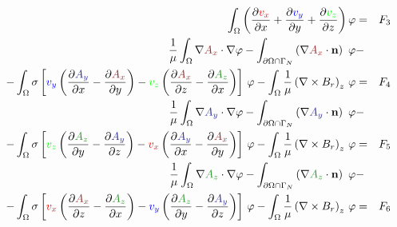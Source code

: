 \documentclass[smallextended]{svjour3}       %
\begin{document}
\begin{eqnarray}
			\int_{\Omega} \left(\frac{\partial \textcolor{red}{v_x}}{\partial x} + \frac{\partial \textcolor{blu}{v_y}}{\partial y} + \frac{\partial \textcolor{gre}{v_z}}{\partial z}\right) \varphi & = & F_3\\
			\frac{1}{\mu}\int_{\Omega}\nabla \textcolor{darkred}{A_x} \cdot \nabla \varphi - \int_{\partial \Omega \cap \Gamma_{N}} \left(\nabla \textcolor{darkred}{A_x}\cdot \mathbf{n}\right)\ \varphi 
			 \nonumber& - \\
			-  \int_{\Omega} \sigma \left[\textcolor{blu}{v_y} \left(\frac{\partial \textcolor{darkblu}{A_y}}{\partial x} - \frac{\partial \textcolor{darkred}{A_x}}{\partial y}\right) - \textcolor{gre}{v_z} \left(\frac{\partial \textcolor{darkred}{A_x}}{\partial z} - \frac{\partial \textcolor{darkgre}{A_z}}{\partial x}\right)\right]\,\varphi -\int_{\Omega}\frac{1}{\mu} \left(\nabla \times B_r \right)_z\,\varphi & = & F_4\\			
			\frac{1}{\mu}\int_{\Omega}\nabla \textcolor{darkblu}{A_y} \cdot \nabla \varphi - \int_{\partial \Omega \cap \Gamma_{N}} \left(\nabla \textcolor{darkblu}{A_y}\cdot \mathbf{n}\right)\ \varphi 
			 \nonumber& - \\
			- \int_{\Omega} \sigma \left[\textcolor{gre}{v_z} \left(\frac{\partial \textcolor{darkgre}{A_z}}{\partial y} - \frac{\partial \textcolor{darkblu}{A_y}}{\partial z}\right) - \textcolor{red}{v_x} \left(\frac{\partial \textcolor{darkblu}{A_y}}{\partial x} - \frac{\partial \textcolor{darkred}{A_x}}{\partial y}\right)\right]\,\varphi -\int_{\Omega}\frac{1}{\mu} \left(\nabla \times B_r \right)_z\,\varphi & = & F_5\\			
			\frac{1}{\mu}\int_{\Omega}\nabla \textcolor{darkgre}{A_z} \cdot \nabla \varphi - \int_{\partial \Omega \cap \Gamma_{N}} \left(\nabla \textcolor{darkgre}{A_z}\cdot \mathbf{n}\right)\ \varphi 
			 \nonumber& - \\
			-  \int_{\Omega} \sigma \left[\textcolor{red}{v_x} \left(\frac{\partial \textcolor{darkred}{A_x}}{\partial z} - \frac{\partial \textcolor{darkgre}{A_z}}{\partial x}\right) - \textcolor{blu}{v_y} \left(\frac{\partial \textcolor{darkgre}{A_z}}{\partial y} - \frac{\partial \textcolor{darkblu}{A_y}}{\partial z}\right)\right]\,\varphi -\int_{\Omega}\frac{1}{\mu} \left(\nabla \times B_r \right)_z\,\varphi & = & F_6\\
			 \nonumber 
		\end{eqnarray}
		
\end{document}
